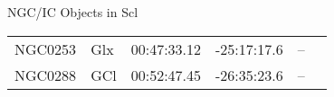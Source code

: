\begin{block}{NGC/IC Objects in Scl}
  \centering
  \begin{tabularx}{\textwidth}{llrrll} 
    NGC0253 & Glx & 00:47:33.12 & -25:17:17.6  & -- \\ 
    NGC0288 & GCl & 00:52:47.45 & -26:35:23.6  & -- \\ 
  \end{tabularx}
\end{block}